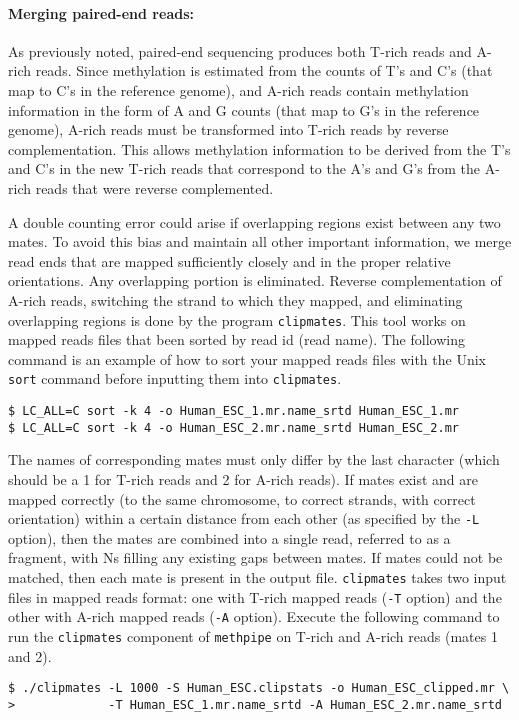 \documentclass[10pt]{article}
\newcommand{\meth}{\texttt{methpipe}}
\newcommand{\prog}[1]{\texttt{#1}}
\newcommand{\op}[1]{\texttt{#1}}
\begin{document}
\paragraph{Merging paired-end reads:}
As previously noted, paired-end sequencing produces both T-rich reads
and A-rich reads. Since methylation is estimated from the counts of T's
and C's (that map to C's in the reference genome), and A-rich reads
contain methylation information in the form of A and G counts (that
map to G's in the reference genome), A-rich reads must be transformed
into T-rich reads by reverse complementation. This allows methylation
information to be derived from the T's and C's in the new T-rich reads
that correspond to the A's and G's from the A-rich reads that were
reverse complemented.

A double counting error could arise if overlapping regions exist
between any two mates. To avoid this bias and maintain all other
important information, we merge read ends that are mapped sufficiently
closely and in the proper relative orientations. Any overlapping portion
is eliminated. Reverse complementation of A-rich reads, switching
the strand to which they mapped, and eliminating overlapping regions is
done by the program \prog{clipmates}. This tool works on mapped reads
files that been sorted by read id (read name). The following command
is an example of how to sort your mapped reads files with the Unix
\prog{sort} command before inputting them into \prog{clipmates}.
\begin{verbatim}
$ LC_ALL=C sort -k 4 -o Human_ESC_1.mr.name_srtd Human_ESC_1.mr
$ LC_ALL=C sort -k 4 -o Human_ESC_2.mr.name_srtd Human_ESC_2.mr
\end{verbatim}
The names of corresponding mates must only differ by the last
character (which should be a 1 for T-rich reads and 2 for A-rich
reads). If mates exist and are mapped correctly (to the same
chromosome, to correct strands, with correct orientation) within a
certain distance from each other (as specified by the \op{-L} option),
then the mates are combined into a single read, referred to as a
fragment, with Ns filling any existing gaps between mates. If mates
could not be matched, then each mate is present in the output
file. \prog{clipmates} takes two input files in mapped reads format:
one with T-rich mapped reads (\op{-T} option) and the other with A-rich
mapped reads (\op{-A} option). Execute the following command to run the
\prog{clipmates} component of \meth{} on T-rich and A-rich reads
(mates 1 and 2).
\begin{verbatim}
$ ./clipmates -L 1000 -S Human_ESC.clipstats -o Human_ESC_clipped.mr \
>             -T Human_ESC_1.mr.name_srtd -A Human_ESC_2.mr.name_srtd
\end{verbatim}
\end{document}
